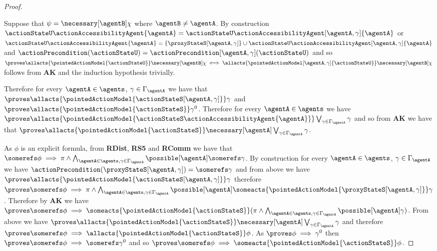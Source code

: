 \documentclass[twoside]{aiml14}
\begin{document}
\begin{proof}
\begin{enumerate}
              Suppose that $\psi = \necessary[\agentB] \chi$ where $\agentB \neq \agentA$.
              By construction $\actionStateU \actionAccessibilityAgent{\agentA} = \actionStateU \actionAccessibilityAgent[\agentA,\gamma]{\agentA}$
              or $\actionStateU \actionAccessibilityAgent{\agentA} = \{\proxyStateS[\agentA,\gamma]\} \cup \actionStateU \actionAccessibilityAgent[\agentA,\gamma]{\agentA}$
              and $\actionPrecondition(\actionStateU) = \actionPrecondition[\agentA,\gamma](\actionStateU)$
              and so $\proves \allacts{\pointedActionModel{\actionStateU}} \necessary[\agentB] \chi \iff \allacts{\pointedActionModel[\agentA,\gamma]{\actionStateU}} \necessary[\agentB] \chi$
              follows from {\bf AK} and the induction hypothesis trivially.
      \end{enumerate}

      Therefore for every $\agentA \in \agents$, $\gamma \in \Gamma_\agentA$ 
      we have that $\proves \allacts{\pointedActionModel{\actionStateS[\agentA,\gamma]}} \gamma$ 
      and $\proves \allacts{\pointedActionModel{\actionStateS}} \gamma^0$.
      Therefore for every $\agentA \in \agents$ 
      we have $\proves \allacts{\pointedActionModel{\actionStateS \actionAccessibilityAgent{\agentA}}} \bigvee_{\gamma \in \Gamma_\agentA} \gamma$
      and so from {\bf AK} we have that $\proves \allacts{\pointedActionModel{\actionStateS}} \necessary[\agentA] \bigvee_{\gamma \in \Gamma_\agentA} \gamma$.

      As $\phi$ is an explicit formula, from {\bf RDist}, {\bf RS5} and {\bf RComm} we have that
      $\somerefs \phi \implies \pi \land \bigwedge_{\agentA \in \agents, \gamma \in \Gamma_\agentA} \possible[\agentA] \somerefs \gamma$.
      By construction for every $\agentA \in \agents$, $\gamma \in \Gamma_\agentA$ 
      we have $\actionPrecondition(\proxyStateS[\agentA,\gamma]) = \somerefs \gamma$ 
      and from above we have $\proves \allacts{\pointedActionModel{\actionStateS[\agentA,\gamma]}} \gamma$ 
      therefore $\proves \somerefs \phi \implies \pi \land \bigwedge_{\agentA \in \agents, \gamma \in \Gamma_\agentA} \possible[\agentA] \someacts{\pointedActionModel{\proxyStateS[\agentA,\gamma]}} \gamma$.
      Therefore by {\bf AK} we have $\proves \somerefs \phi \implies \someacts{\pointedActionModel{\actionStateS}} (\pi \land \bigwedge_{\agentA \in \agents, \gamma \in \Gamma_\agentA} \possible[\agentA] \gamma)$.
      From above we have $\proves \allacts{\pointedActionModel{\actionStateS}} \necessary[\agentA] \bigvee_{\gamma \in \Gamma_\agentA} \gamma$
      and therefore $\proves \somerefs \phi \implies \allacts{\pointedActionModel{\actionStateS}} \phi$.
      As $\proves \phi \implies \gamma^0$ then $\proves \somerefs \phi \implies \somerefs \gamma^0$ 
      and so $\proves \somerefs \phi \implies \someacts{\pointedActionModel{\actionStateS}} \phi$.


\end{proof}
\end{document}
